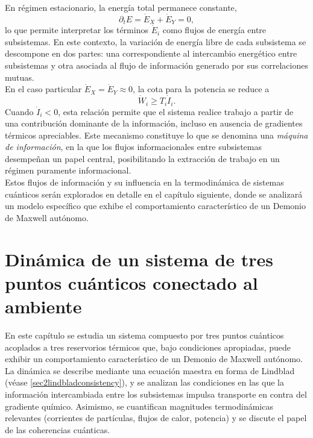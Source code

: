 En régimen estacionario, la energía total permanece constante,
\[
    \partial_{t}E = \dot{E}_{X} + \dot{E}_{Y} = 0,
\]
lo que permite interpretar los términos $\dot{E}_{i}$ como flujos de energía entre subsistemas. En este contexto, la variación de energía libre de cada subsistema se descompone en dos partes: una correspondiente al intercambio energético entre subsistemas y otra asociada al flujo de información generado por sus correlaciones mutuas.
\\

En el caso particular $\dot{E}_{X} = \dot{E}_{Y} \approx 0$, la cota para la potencia se reduce a
\[
     \dot{W}_{i} \geq T_{i}\dot{I}_{i}.
\]
Cuando $\dot{I}_{i}<0$, esta relación permite que el sistema realice trabajo a partir de una contribución dominante de la información, incluso en ausencia de gradientes térmicos apreciables. Este mecanismo constituye lo que se denomina una \textit{máquina de información}, en la que los flujos informacionales entre subsistemas desempeñan un papel central, posibilitando la extracción de trabajo en un régimen puramente informacional. 
\\

Estos flujos de información y su influencia en la termodinámica de sistemas cuánticos serán explorados en detalle en el capítulo siguiente, donde se analizará un modelo específico que exhibe el comportamiento característico de un Demonio de Maxwell autónomo.

\label{sec4:flujos0}

\chapter{Dinámica de un sistema de tres puntos cuánticos conectado al ambiente}

En este capítulo se estudia un sistema compuesto por tres puntos cuánticos acoplados a tres reservorios térmicos que, bajo condiciones apropiadas, puede exhibir un comportamiento característico de un Demonio de Maxwell autónomo. La dinámica se describe mediante una ecuación maestra en forma de Lindblad (véase \ref{sec2lindbladconsistency}), y se analizan las condiciones en las que la información intercambiada entre los subsistemas impulsa transporte en contra del gradiente químico. Asimismo, se cuantifican magnitudes termodinámicas relevantes (corrientes de partículas, flujos de calor, potencia) y se discute el papel de las coherencias cuánticas.
\\

